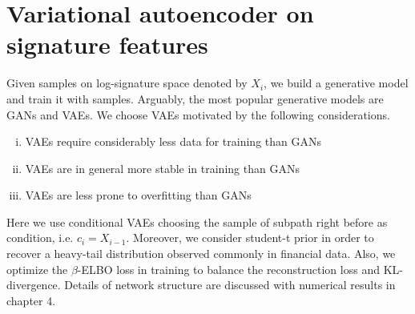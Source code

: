 \documentclass[12pt]{report}
\theoremstyle{definition}
\theoremstyle{remark}
\begin{document}
\section{Variational autoencoder on signature features}
Given samples on log-signature space denoted by $X_{i}$, we build a generative model and train it with samples. Arguably, the most popular generative models are GANs and VAEs. We choose VAEs motivated by the following considerations. 
\begin{enumerate}[(i)]
  \item VAEs require considerably less data for training than GANs 
  \item VAEs are in general more stable in training than GANs
  \item VAEs are less prone to overfitting than GANs
\end{enumerate}
Here we use conditional VAEs choosing the sample of subpath right before as condition, i.e. $c_{i} = X_{i-1}$. Moreover, we consider student-t prior in order to recover a heavy-tail distribution observed commonly in financial data. Also, we optimize the $\beta$-ELBO loss in training to balance the reconstruction loss and KL-divergence. Details of network structure are discussed with numerical results in chapter 4. 
\end{document}
